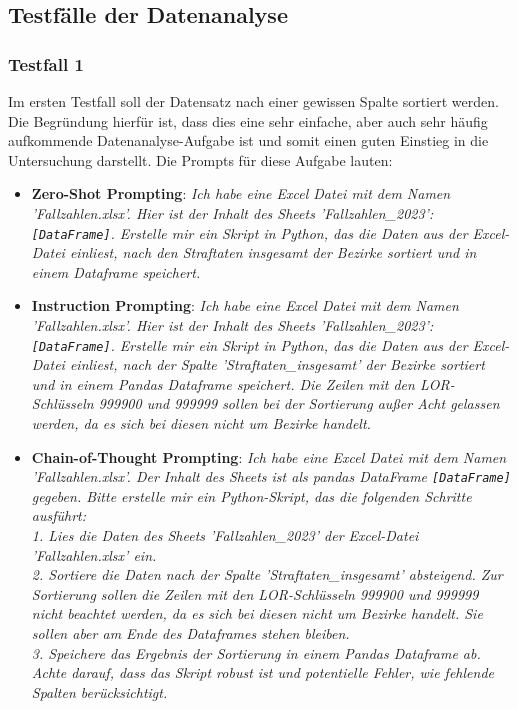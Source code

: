 \documentclass[11pt,a4paper]{article}
\begin{document}
\subsection{Testfälle der Datenanalyse}
\label{sec:testfaelle}
\subsubsection{Testfall 1}
    Im ersten Testfall soll der Datensatz nach einer gewissen Spalte sortiert werden. Die Begründung hierfür ist, dass dies eine sehr einfache, aber auch sehr häufig aufkommende Datenanalyse-Aufgabe ist und somit einen guten Einstieg in die Untersuchung darstellt. Die Prompts für diese Aufgabe lauten:
    \begin{itemize}
        \item \textbf{Zero-Shot Prompting}: \emph{Ich habe eine Excel Datei mit dem Namen 'Fallzahlen.xlsx'. Hier ist der Inhalt des Sheets 'Fallzahlen\_2023': \texttt{[DataFrame]}. Erstelle mir ein Skript in Python, das die Daten aus der Excel-Datei einliest, nach den Straftaten insgesamt der Bezirke sortiert und in einem Dataframe speichert.}
        \item \textbf{Instruction Prompting}: \emph{Ich habe eine Excel Datei mit dem Namen 'Fallzahlen.xlsx'. Hier ist der Inhalt des Sheets 'Fallzahlen\_2023': \texttt{[DataFrame]}. Erstelle mir ein Skript in Python, das die Daten aus der Excel-Datei einliest, nach der Spalte 'Straftaten\_insgesamt' der Bezirke sortiert und in einem Pandas Dataframe speichert. Die Zeilen mit den LOR-Schlüsseln 999900 und 999999 sollen bei der Sortierung außer Acht gelassen werden, da es sich bei diesen nicht um Bezirke handelt.}
        \item \textbf{Chain-of-Thought Prompting}: \emph{Ich habe eine Excel Datei mit dem Namen 'Fallzahlen.xlsx'. Der Inhalt des Sheets ist als pandas DataFrame \texttt{[DataFrame]} gegeben. Bitte erstelle mir ein Python-Skript, das die folgenden Schritte ausführt:\\1. Lies die Daten des Sheets 'Fallzahlen\_2023' der Excel-Datei 'Fallzahlen.xlsx' ein.\\2. Sortiere die Daten nach der Spalte 'Straftaten\_insgesamt' absteigend. Zur Sortierung sollen die Zeilen mit den LOR-Schlüsseln 999900 und 999999 nicht beachtet werden, da es sich bei diesen nicht um Bezirke handelt. Sie sollen aber am Ende des Dataframes stehen bleiben.\\3. Speichere das Ergebnis der Sortierung in einem Pandas Dataframe ab.\\Achte darauf, dass das Skript robust ist und potentielle Fehler, wie fehlende Spalten berücksichtigt.}
    \end{itemize}
\end{document}
